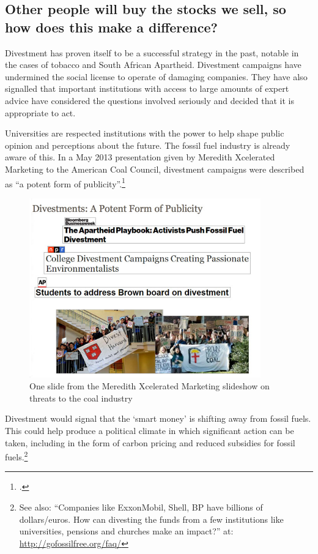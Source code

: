	\subsection{Other people will buy the stocks we sell, so how does this make a difference?}
	\label{OthersWillBuy}
	


Divestment has proven itself to be a successful strategy in the past, notable in the cases of tobacco and South African Apartheid.
Divestment campaigns have undermined the social license to operate of damaging companies.
They have also signalled that important institutions with access to large amounts of expert advice have considered the questions involved seriously and decided that it is appropriate to act.



Universities are respected institutions with the power to help shape public opinion and perceptions about the future.
The fossil fuel industry is already aware of this.
In a May 2013 presentation given by Meredith Xcelerated Marketing to the American Coal Council, divestment campaigns were described as ``a potent form of publicity''.\footcite[][]{PotentPublicity}



\begin{figure}[h]
\includegraphics[width=100mm]{s7-divest-slide.png}
\centering
\caption{One slide from the Meredith Xcelerated Marketing slideshow on threats to the coal industry}
\label{fig:DivestSlide}
\end{figure}




Divestment would signal that the `smart money' is shifting away from fossil fuels. 
This could help produce a political climate in which significant action can be taken, including in the form of carbon pricing and reduced subsidies for fossil fuels.\footnote{See also: ``Companies like ExxonMobil, Shell, BP have billions of dollars/euros. How can divesting the funds from a few institutions like universities, pensions and churches make an impact?'' at: \url{http://gofossilfree.org/faq/}}


